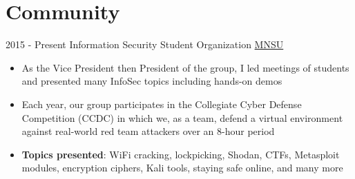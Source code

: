 \documentclass[letterpaper]{twentysecondcv} %
\begin{document}
\section{Community}

\begin{twenty}
    \twentyitem
    	{2015 -}
		{Present}
        {Information Security Student Organization}
        {\href{https://mankato.mnsu.edu/}{MNSU}}
        {}
        {\begin{itemize}
        \item As the Vice President then President of the group, I led meetings of students and presented many InfoSec topics including hands-on demos
        \item Each year, our group participates in the Collegiate Cyber Defense Competition (CCDC) in which we, as a team, defend a virtual environment against real-world red team attackers over an 8-hour period
        \item \textbf{Topics presented}: WiFi cracking, lockpicking, Shodan, CTFs, Metasploit modules, encryption ciphers, Kali tools, staying safe online, and many more
        \end{itemize}}
\end{twenty}
\end{document}
